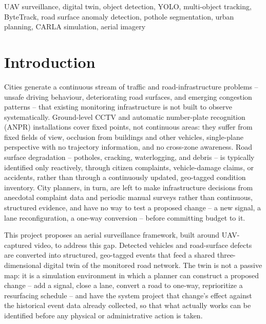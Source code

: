 \documentclass[conference]{IEEEtran}
\begin{document}
\begin{abstract}
presented here as designed system architecture with its implementation status explicitly marked as pending, to be completed and evaluated in subsequent work.
\end{abstract}

\begin{IEEEkeywords}
UAV surveillance, digital twin, object detection, YOLO, multi-object tracking, ByteTrack, road surface anomaly detection, pothole segmentation, urban planning, CARLA simulation, aerial imagery
\end{IEEEkeywords}

\section{Introduction}

Cities generate a continuous stream of traffic and road-infrastructure problems -- unsafe driving behaviour, deteriorating road surfaces, and emerging congestion patterns -- that existing monitoring infrastructure is not built to observe systematically. Ground-level CCTV and automatic number-plate recognition (ANPR) installations cover fixed points, not continuous areas: they suffer from fixed fields of view, occlusion from buildings and other vehicles, single-plane perspective with no trajectory information, and no cross-zone awareness. Road surface degradation -- potholes, cracking, waterlogging, and debris -- is typically identified only reactively, through citizen complaints, vehicle-damage claims, or accidents, rather than through a continuously updated, geo-tagged condition inventory. City planners, in turn, are left to make infrastructure decisions from anecdotal complaint data and periodic manual surveys rather than continuous, structured evidence, and have no way to test a proposed change -- a new signal, a lane reconfiguration, a one-way conversion -- before committing budget to it.

This project proposes an aerial surveillance framework, built around UAV-captured video, to address this gap. Detected vehicles and road-surface defects are converted into structured, geo-tagged events that feed a shared three-dimensional digital twin of the monitored road network. The twin is not a passive map: it is a simulation environment in which a planner can construct a proposed change -- add a signal, close a lane, convert a road to one-way, reprioritize a resurfacing schedule -- and have the system project that change's effect against the historical event data already collected, so that what actually works can be identified before any physical or administrative action is taken.
\end{document}
